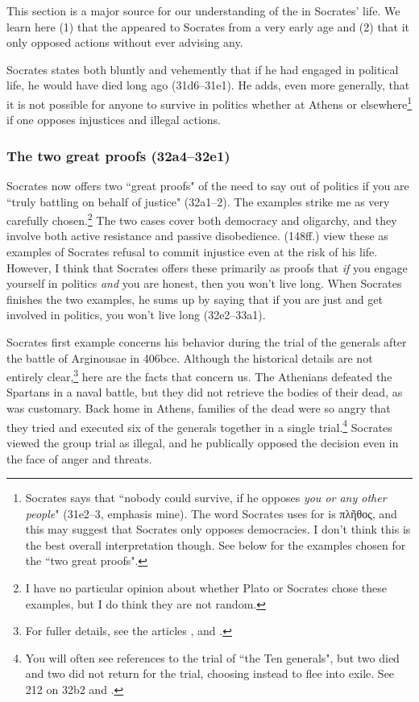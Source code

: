 \documentclass[11pt]{article}
\begin{document}
This section is a major source for our understanding of the 
in Socrates' life.  We learn here (1) that the  appeared to
Socrates from a very early age and (2) that it only opposed actions without
ever advising any.

Socrates states both bluntly and vehemently that if he had engaged in political
life, he would have died long ago (31d6--31e1).  He adds, even more generally,
that it is not possible for anyone to survive in politics whether at Athens or
elsewhere\footnote{Socrates says that ``nobody could survive, if he opposes
\emph{you or any other people}" (31e2--3, emphasis mine).  The word Socrates
uses for  is {\g πλῆθος}, and this may suggest that Socrates only
opposes democracies.  I don't think this is the best overall interpretation
though.  See below for the examples chosen for the ``two great proofs".} if one
opposes injustices and illegal actions.


\subsubsection{The two great proofs (32a4--32e1)}

Socrates now offers two ``great proofs" of the need to say out of politics if
you are ``truly battling on behalf of justice" (32a1--2).  The examples strike
me as very carefully chosen.\footnote{I have no particular opinion about
whether Plato or Socrates chose these examples, but I do think they are not
random.}  The two cases cover both democracy and oligarchy, and they involve
both active resistance and passive disobedience.  \citet{brickhouse2004}
(148ff.) view these as examples of Socrates refusal to commit injustice even at
the risk of his life.  However, I think that Socrates offers these primarily as
proofs that \emph{if} you engage yourself in politics \emph{and} you are
honest, then you won't live long.  When Socrates finishes the two examples, he
sums up by saying that if you are just and get involved in politics, you won't
live long (32e2--33a1).

Socrates first example concerns his behavior during the trial of the generals
after the battle of Arginousae in 406bce.  Although the historical details are
not entirely clear,\footnote{For fuller details, see the articles
\citet{andrewes1974}, \citet{lang1990} and \citet{lang1992}.} here are the
facts that concern us.  The Athenians defeated the Spartans in a naval battle,
but they did not retrieve the bodies of their dead, as was customary.  Back
home in Athens, families of the dead were so angry that they tried and executed
six of the generals together in a single trial.\footnote{You will often see
references to the trial of ``the Ten generals", but two died and two did not
return for the trial, choosing instead to flee into exile.  See
\citet{burnet1924} 212 on 32b2 and \citet{lang1992}.}  Socrates viewed the
group trial as illegal, and he publically opposed the decision even in the face
of anger and threats.
\end{document}
